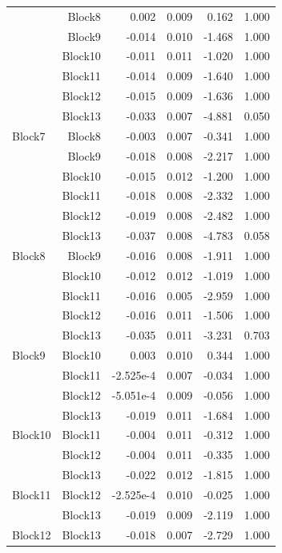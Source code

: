 \begin{longtable}{lrrrrr}
	  & Block8 & 0.002 & 0.009 & 0.162 & 1.000  \\
	 & Block9 & -0.014 & 0.010 & -1.468 & 1.000  \\
	 & Block10 & -0.011 & 0.011 & -1.020 & 1.000  \\
	 & Block11 & -0.014 & 0.009 & -1.640 & 1.000  \\
	 & Block12 & -0.015 & 0.009 & -1.636 & 1.000  \\
	 & Block13 & -0.033 & 0.007 & -4.881 & 0.050  \\
	Block7 & Block8 & -0.003 & 0.007 & -0.341 & 1.000  \\
	  & Block9 & -0.018 & 0.008 & -2.217 & 1.000  \\
	 & Block10 & -0.015 & 0.012 & -1.200 & 1.000  \\
	 & Block11 & -0.018 & 0.008 & -2.332 & 1.000  \\
	 & Block12 & -0.019 & 0.008 & -2.482 & 1.000  \\
	 & Block13 & -0.037 & 0.008 & -4.783 & 0.058  \\
	Block8 & Block9 & -0.016 & 0.008 & -1.911 & 1.000  \\
	  & Block10 & -0.012 & 0.012 & -1.019 & 1.000  \\
	 & Block11 & -0.016 & 0.005 & -2.959 & 1.000  \\
	 & Block12 & -0.016 & 0.011 & -1.506 & 1.000  \\
	 & Block13 & -0.035 & 0.011 & -3.231 & 0.703  \\
	Block9 & Block10 & 0.003 & 0.010 & 0.344 & 1.000  \\
	  & Block11 & -2.525e-4 & 0.007 & -0.034 & 1.000  \\
	 & Block12 & -5.051e-4 & 0.009 & -0.056 & 1.000  \\
	 & Block13 & -0.019 & 0.011 & -1.684 & 1.000  \\
	Block10 & Block11 & -0.004 & 0.011 & -0.312 & 1.000  \\
	  & Block12 & -0.004 & 0.011 & -0.335 & 1.000  \\
	 & Block13 & -0.022 & 0.012 & -1.815 & 1.000  \\
	Block11 & Block12 & -2.525e-4 & 0.010 & -0.025 & 1.000  \\
	  & Block13 & -0.019 & 0.009 & -2.119 & 1.000  \\
	Block12 & Block13 & -0.018 & 0.007 & -2.729 & 1.000  \\
	\hline\hline
\end{longtable} 


